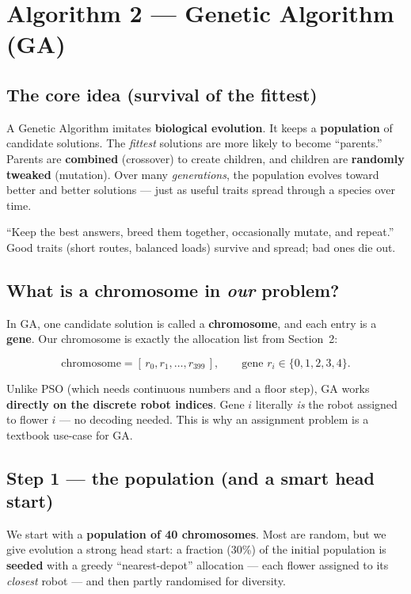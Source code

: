 \documentclass[11pt]{article}
\begin{document}
\section{Algorithm 2 --- Genetic Algorithm (GA)}

\subsection{The core idea (survival of the fittest)}

A Genetic Algorithm imitates \textbf{biological evolution}. It keeps a
\textbf{population} of candidate solutions. The \emph{fittest} solutions are more
likely to become ``parents.'' Parents are \textbf{combined} (crossover) to
create children, and children are \textbf{randomly tweaked} (mutation). Over many
\emph{generations}, the population evolves toward better and better solutions ---
just as useful traits spread through a species over time.

\begin{intuition}
``Keep the best answers, breed them together, occasionally mutate, and repeat.''
Good traits (short routes, balanced loads) survive and spread; bad ones die out.
\end{intuition}

\subsection{What is a chromosome in \emph{our} problem?}

In GA, one candidate solution is called a \textbf{chromosome}, and each entry is
a \textbf{gene}. Our chromosome is exactly the allocation list from Section~2:

\[
\text{chromosome} = [\,r_0, r_1, \dots, r_{399}\,],\qquad
\text{gene } r_i \in \{0,1,2,3,4\}.
\]

\begin{tcolorbox}[colback=blue!5!white,colframe=blue!50!black,title=GA is a natural fit for this problem]
Unlike PSO (which needs continuous numbers and a floor step), GA works
\textbf{directly on the discrete robot indices}. Gene $i$ literally \emph{is} the
robot assigned to flower $i$ --- no decoding needed. This is why an assignment
problem is a textbook use-case for GA.
\end{tcolorbox}

\subsection{Step 1 --- the population (and a smart head start)}
We start with a \textbf{population of 40 chromosomes}. Most are random, but we
give evolution a strong head start: a fraction (30\%) of the initial population
is \textbf{seeded} with a greedy ``nearest-depot'' allocation --- each flower
assigned to its \emph{closest} robot --- and then partly randomised for
diversity.
\end{document}
